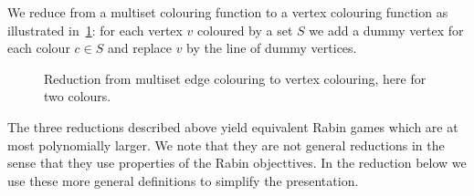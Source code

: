 \begin{itemize}
We reduce from a multiset colouring function to a vertex colouring function as illustrated in~\cref{2-fig:reduction_multiset_colouring}: 
for each vertex $v$ coloured by a set $S$ we add a dummy vertex for each colour $c \in S$ and replace $v$ by the line of dummy vertices.

\begin{figure}[!ht]
\centering
\caption{Reduction from multiset edge colouring to vertex colouring, here for two colours.}
\label{2-fig:reduction_multiset_colouring}
\end{figure}
	
\end{itemize}
The three reductions described above yield equivalent Rabin games which are at most polynomially larger.
We note that they are not general reductions in the sense that they use properties of the Rabin objecttives.
In the reduction below we use these more general definitions to simplify the presentation.

